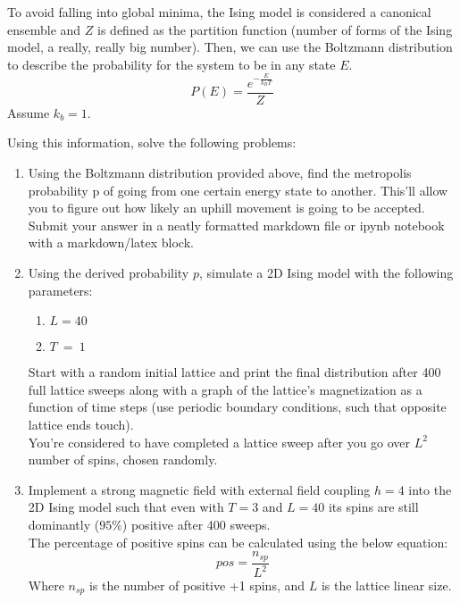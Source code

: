 \documentclass[12pt]{article}
\begin{document}
To avoid falling into global minima, the Ising model is considered a canonical ensemble and $Z$ is defined as the partition function (number of forms of the Ising model, a really, really big number). Then, we can use the Boltzmann distribution to describe the probability for the system to be in any state $E$.
$$P\left(E\right)=\frac{e^{-\frac{E}{k_BT}}}{Z}$$
Assume $k_b=1$. 

Using this information, solve the following problems:
\begin{enumerate}
    \item 	Using the Boltzmann distribution provided above, find the metropolis probability p of going from one certain energy state to another. This’ll allow you to figure out how likely an uphill movement is going to be accepted.\\
    Submit your answer in a neatly formatted markdown file or ipynb notebook with a markdown/latex block.

    \item Using the derived probability $p$, simulate a 2D Ising model with the following parameters:
    \begin{enumerate}
        \item $	L=40$
        \item $	T\ =\ 1$
    \end{enumerate}
    Start with a random initial lattice and print the final distribution after 400 full lattice sweeps along with a graph of the lattice’s magnetization as a function of time steps (use periodic boundary conditions, such that opposite lattice ends touch).\\
    You’re considered to have completed a lattice sweep after you go over $L^2 $ number of spins, chosen randomly.

    \item 	Implement a strong magnetic field with external field coupling $ h=4$ into the 2D Ising model such that even with $T=3$ and $L=40$ its spins are still dominantly ($95\%$) positive after 400 sweeps.\\
    The percentage of positive spins can be calculated using the below equation:
    $$pos=\frac{n_{sp}}{L^2}$$
    Where $n_{sp}$ is the number of positive +1 spins, and $L$ is the lattice linear size.


\end{enumerate}
\end{document}
